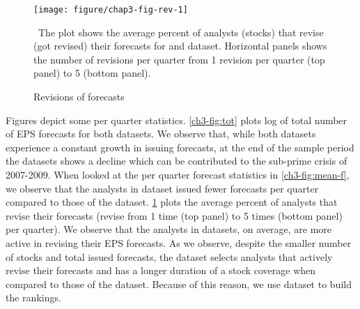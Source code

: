 \documentclass[a4paper,twoside,12pt,openright,notitlepage]{report}\usepackage[]{graphicx}\usepackage[]{color}
\makeatletter
\def\maxwidth{ %
  \ifdim\Gin@nat@width>\linewidth
    \linewidth
  \else
    \Gin@nat@width
  \fi
}
\newenvironment{knitrout}{}{} %
\makeatother
\begin{document}
%
%
%

\begin{figure}
\begin{knitrout}
\color{fgcolor}
\texttt{[image: figure/chap3-fig-rev-1]} 

\end{knitrout}
\caption{Revisions of forecasts}
\ The plot shows the average percent of analysts (stocks) that revise (got revised) their forecasts for \sample{} and \filtered{} dataset. Horizontal panels shows the number of revisions per quarter from 1 revision per quarter (top panel) to 5 (bottom panel).
\label{ch3-fig:rev}
\end{figure}
Figures  depict some per quarter statistics. \ref{ch3-fig:tot} plots log of total number of EPS forecasts for both datasets. We observe that, while both datasets experience a constant growth in issuing forecasts, at the end of the sample period the \filtered{} datasets shows a decline which can be contributed to the sub-prime crisis of 2007-2009. When looked at the per quarter forecast statistics in \ref{ch3-fig:mean-f}, we observe that the analysts in \filtered{} dataset issued fewer forecasts per quarter compared to those of the \sample{} dataset. \ref{ch3-fig:rev} plots the average percent of analysts that revise their forecasts (revise from 1 time (top panel) to 5 times (bottom panel) per quarter). We observe that the analysts in \filtered{} datasets, on average, are more active in revising their EPS forecasts. As we observe, despite the smaller number of stocks and total issued forecasts, the \filtered{} dataset selects analysts that actively revise their forecasts and has a longer duration of a stock coverage when compared to those of the \sample{} dataset. Because of this reason, we use \filtered{} dataset to build the rankings.
\end{document}
